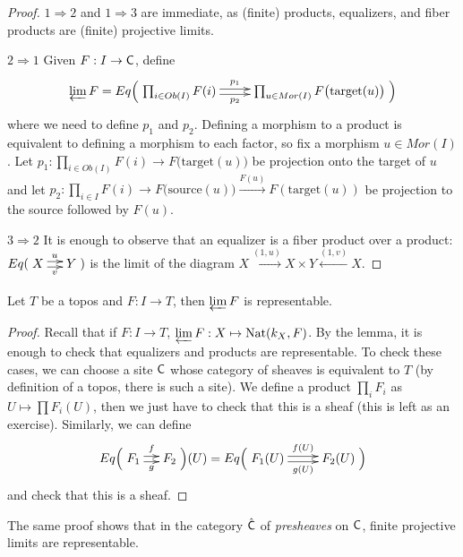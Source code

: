  \begin{proof}
   $1\Rightarrow 2$ and $1\Rightarrow 3$ are immediate, as (finite) products, equalizers,
   and fiber products are (finite) projective limits.

   $2\Rightarrow 1$ Given $F:I\to \text{\sf C}$, define
    \[
   \varprojlim F = Eq\Bigl(\xymatrix{\prod_{i\in Ob(I)} F(i) \ar@<.5ex>[r]^<>(.5){p_1}
   \ar@<-.5ex>[r]_<>(.5){p_2} & \prod_{u\in Mor(I)} F\bigl(\text{target}(u)\bigr)}\Bigr)
   \]
    where we need to define $p_1$ and $p_2$. Defining a morphism to a product is
   equivalent to defining a morphism to each factor, so fix a morphism $u\in Mor(I)$. Let
   $p_1:\prod_{i\in Ob(I)} F(i)\to F\bigl(\text{target}(u)\bigr)$ be projection onto the
   target of $u$ and let $p_2:\prod_{i\in I}F(i) \to
   F\bigl(\text{source}(u)\bigr)\xrightarrow{F(u)}F(\text{target}(u))$ be projection to the
   source followed by $F(u)$.

   $3\Rightarrow 2$ It is enough to observe that an equalizer is a fiber product over a
   product: $Eq(\xymatrix@-1pc{X\ar@<.5ex>[r]^u \ar@<-.5ex>[r]_v & Y})$ is the limit of the
   diagram $X\xrightarrow{(1,u)}X\times Y \xleftarrow{(1,v)} X$.
 \end{proof}
 \begin{proposition}
   Let $T$ be a topos and $F:I\to T$, then $\varprojlim F$ is representable.
 \end{proposition}
 \begin{proof}
   Recall that if $F:I\to T$, $\varprojlim F: X\mapsto \operatorname{Nat}(k_X,F)$. By the lemma, it is
   enough to check that equalizers and products are representable. To check these cases,
   we can choose a site $\text{\sf C}$ whose category of sheaves is equivalent to $T$ (by
   definition of a topos, there is such a site). We define a product $\prod_i F_i$ as
   $U\mapsto \prod F_i(U)$, then we just have to check that this is a sheaf (this is left
   as an exercise). Similarly, we can define
    \[
   Eq\Bigl(\xymatrix@-1pc{F_1\ar@<.5ex>[r]^f \ar@<-.5ex>[r]_g &
   F_2}\Bigr)(U)=Eq\Bigl(\xymatrix{F_1(U)\ar@<.5ex>[r]^{f(U)} \ar@<-.5ex>[r]_{g(U)} &
   F_2(U)}\Bigr)
   \]
    and check that this is a sheaf.
 \end{proof}
 \begin{remark}
   The same proof shows that in the category $\hat {\text{\sf C}}$ of \emph{presheaves} on $\text{\sf C}$,
   finite projective limits are representable.
 \end{remark}
